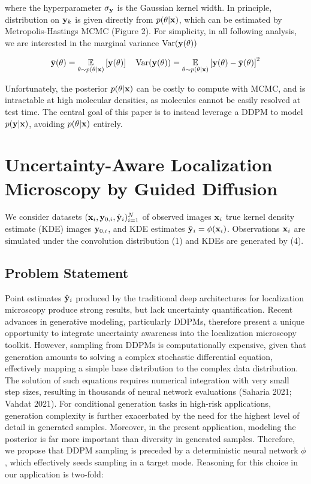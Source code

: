 \documentclass{article}
\begin{document}
where the hyperparameter $\sigma_{\bold{y}}$ is the Gaussian kernel width. In principle, distribution on $\bold{y}_{k}$ is given directly from $p(\theta|\bold{x})$, which can be estimated by Metropolis-Hastings MCMC (Figure 2). For simplicity, in all following analysis, we are interested in the marginal variance $\mathrm{Var} (\bold{y}(\theta))$

\begin{equation}
\bar{\bold{y}}(\theta) = \underset{\theta\sim p(\theta|\bold{x})}{\mathbb{E}}\left[ \bold{y}(\theta)\right] \quad \mathrm{Var} (\bold{y}(\theta)) = \underset{\theta\sim p(\theta|\bold{x})}{\mathbb{E}}\left[ \bold{y}(\theta)-\bar{\bold{y}}(\theta)\right]^2
\end{equation}

Unfortunately, the posterior $p(\theta|\bold{x})$ can be costly to compute with MCMC, and is intractable at high molecular densities, as molecules cannot be easily resolved at test time. The central goal of this paper is to instead leverage a DDPM to model $p(\bold{y}|\bold{x})$, avoiding $p(\theta|\bold{x})$ entirely.

\section{Uncertainty-Aware Localization Microscopy by Guided Diffusion}

We consider datasets $(\bold{x}_i,\bold{y}_{0,i},\hat{\bold{y}}_{i})_{i=1}^{N}$ of observed images $\bold{x}_i$ true kernel density estimate (KDE) images $\bold{y}_{0,i}$, and KDE estimates $\hat{\bold{y}}_{i}=\phi(\bold{x}_{i})$. Observations $\bold{x}_i$ are simulated under the convolution distribution (1) and KDEs are generated by (4).

\subsection{Problem Statement}

Point estimates $\hat{\bold{y}}_{i}$ produced by the traditional deep architectures for localization microscopy produce strong results, but lack uncertainty quantification. Recent advances in generative modeling, particularly DDPMs, therefore present a unique opportunity to integrate uncertainty awareness into the localization microscopy toolkit. However, sampling from DDPMs is computationally expensive, given that generation amounts to solving a complex stochastic differential equation, effectively mapping a simple base distribution to the complex data distribution. The solution of such equations requires numerical integration with very small step sizes, resulting in thousands of neural network evaluations (Saharia 2021; Vahdat 2021). For conditional generation tasks in high-risk applications, generation complexity is further exacerbated by the need for the highest level of detail in generated samples. Moreover, in the present application, modeling the posterior is far more important than diversity in generated samples. Therefore, we propose that DDPM sampling is preceded by a deterministic neural network $\phi$, which effectively seeds sampling in a target mode. Reasoning for this choice in our application is two-fold:
\end{document}
